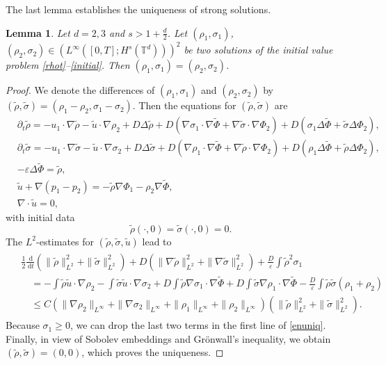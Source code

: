 \documentclass[10pt,twoside,reqno]{amsart}
\numberwithin{figure}{section}
\numberwithin{equation}{section}
\newtheorem{lemma}[theorem]{Lemma}
\theoremstyle{definition}
\newcommand{\1}{\mathbbm{1}}
\newcommand{\diff}{\,\mathrm{d}}
\newcommand{\pt}{\partial_t}
\newcommand{\T}{\mathbb{T}}
\newcommand{\ve}{\varepsilon}
\begin{document}
The last lemma establishes the uniqueness of strong solutions.
\begin{lemma}
Let $d = 2, 3$ and $s > 1 + \frac{d}{2}$. Let $(\rho_1, \sigma_1)$, $(\rho_2, \sigma_2) \in \left(L^\infty([0, T]; H^s(\T^d))\right)^2$ be two solutions of the initial value problem \eqref{rhot}--\eqref{initial}. Then $(\rho_1, \sigma_1) = (\rho_2, \sigma_2)$.
\end{lemma}
\begin{proof}
We denote the differences of $(\rho_1, \sigma_1)$ and $(\rho_2, \sigma_2)$ by $(\tilde{\rho}, \tilde{\sigma}) = (\rho_1 - \rho_2, \sigma_1 - \sigma_2)$. Then the equations for $(\tilde{\rho}, \tilde{\sigma})$ are
\begin{align*}
& \pt \tilde{\rho} = - u_1 \cdot \nabla \tilde{\rho} - \tilde{u} \cdot \nabla \rho_2 + D \Delta \tilde{\rho} + D (\nabla \sigma_1 \cdot \nabla \tilde{\Phi} + \nabla \tilde{\sigma} \cdot \nabla \Phi_2) + D (\sigma_1 \Delta \tilde{\Phi} + \tilde{\sigma} \Delta \Phi_2),\\
& \pt \tilde{\sigma} = - u_1 \cdot \nabla \tilde{\sigma} - \tilde{u} \cdot \nabla \sigma_2 + D \Delta \tilde{\sigma} + D (\nabla \rho_1 \cdot \nabla \tilde{\Phi} + \nabla \tilde{\rho} \cdot \nabla \Phi_2) + D (\rho_1 \Delta \tilde{\Phi} + \tilde{\rho} \Delta \Phi_2),\\
& - \ve \Delta \tilde{\Phi} = \tilde{\rho},\\
& \tilde{u} + \nabla (p_1 - p_2) = - \tilde{\rho} \nabla \Phi_1 - \rho_2 \nabla \tilde{\Phi},\\
& \nabla \cdot \tilde{u} = 0,
\end{align*}
with initial data
\[
\tilde{\rho}(\cdot, 0) = \tilde{\sigma}(\cdot, 0) = 0.
\]
The $L^2$-estimates for $(\tilde{\rho}, \tilde{\sigma}, \tilde{u})$ lead to
\begin{align}
\label{enuniq}
\begin{split}
& \frac{1}{2} \frac{\diff}{\diff{t}} \left(\|\tilde{\rho}\|_{L^2}^2 + \|\tilde{\sigma}\|_{L^2}^2\right) + D \left(\|\nabla \tilde{\rho}\|_{L^2}^2 + \|\nabla \tilde{\sigma}\|_{L^2}^2\right) + \frac{D}{\ve} \int \tilde{\rho}^2 \sigma_1\\
&\quad= - \int \tilde{\rho} \tilde{u} \cdot \nabla \rho_2 - \int \tilde{\sigma} \tilde{u} \cdot \nabla \sigma_2 + D \int \tilde{\rho} \nabla \sigma_1 \cdot \nabla \tilde{\Phi} + D \int \tilde{\sigma} \nabla \rho_1 \cdot \nabla \tilde{\Phi} - \frac{D}{\ve} \int \tilde{\rho} \tilde{\sigma} (\rho_1 + \rho_2)\\
&\quad\leq C \left(\|\nabla \rho_2\|_{L^\infty} + \|\nabla \sigma_2\|_{L^\infty} + \|\rho_1\|_{L^\infty} + \|\rho_2\|_{L^\infty} \right) \left(\|\tilde{\rho}\|_{L^2}^2 + \|\tilde{\sigma}\|_{L^2}^2\right).
\end{split}
\end{align}
Because $\sigma_1 \geq 0$, we can drop the last two terms in the first line of \eqref{enuniq}. Finally, in view of Sobolev embeddings and Gr\"{o}nwall's inequality, we obtain $(\tilde{\rho}, \tilde{\sigma}) = (0, 0)$, which proves the uniqueness.
\end{proof}
\end{document}
